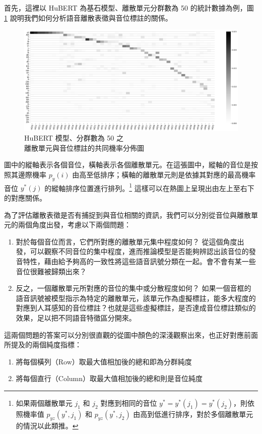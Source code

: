         首先，這裡以 HuBERT 為基石模型、離散單元分群數為 50 的統計數據為例，圖 \ref{fig:hubert-50-joint-byprob} 說明我們如何分析語音離散表徵與音位標註的關係。

\begin{figure}
    \centering
    \includegraphics[width=1\linewidth]{figures/hubert-50-joint-byprob.png}
    \caption{HuBERT 模型、分群數為 50 之 \\
    離散單元與音位標註的共同機率分佈圖}
    \label{fig:hubert-50-joint-byprob}
\end{figure}

        圖中的縱軸表示各個音位，橫軸表示各個離散單元。在這張圖中，縱軸的音位是按照其邊際機率 \(p_y(i)\) 由高至低排序；橫軸的離散單元則是依據其對應的最高機率音位 \(y^\ast(j)\) 的縱軸排序位置進行排列。\footnote{如果兩個離散單元 \(j_1\) 和 \(j_2\) 對應到相同的音位 \(y^\ast = y^\ast(j_1) = y^\ast(j_2)\)，則依照機率值 \(p_{yz}(y^\ast, j_1)\) 和 \(p_{yz}(y^\ast, j_2)\) 由高到低進行排序，對於多個離散單元的情況以此類推。} 這樣可以在熱圖上呈現出由左上至右下的對應關係。

        為了評估離散表徵是否有捕捉到與音位相關的資訊，我們可以分別從音位與離散單元的兩個角度出發，考慮以下兩個問題：
\begin{enumerate}
    \item 對於每個音位而言，它們所對應的離散單元集中程度如何？
從這個角度出發，可以觀察不同音位的集中程度，進而推論模型是否能夠辨認出該音位的發音特性，藉由給予夠高的一致性將這些語音訊號分類在一起。會不會有某一些音位很難被歸類出來？
    \item 反之，一個離散單元所對應的音位的集中或分散程度如何？
如果一個音框的語音訊號被模型指示為特定的離散單元，該單元作為虛擬標註，能多大程度的對應到人耳感知的音位標註？也就是這些虛擬標註，是否達成音位標註類似的效果，足以把不同語音特徵區分開來。
\end{enumerate}

        這兩個問題的答案可以分別很直觀的從圖中顏色的深淺觀察出來，也正好對應前面所提及的兩個純度指標：
        \begin{enumerate}
            \item 將每個橫列（Row）取最大值相加後的總和即為分群純度
            \item 將每個直行（Column）取最大值相加後的總和則是音位純度
        \end{enumerate}

